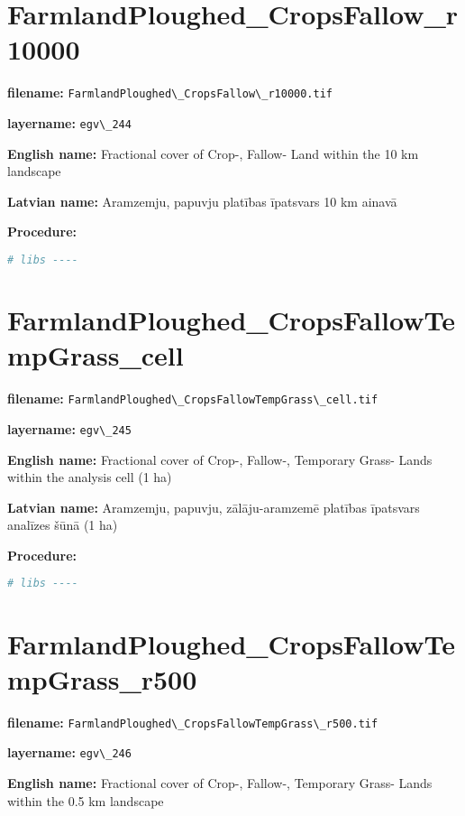 \documentclass[
]{book}
\newcommand{\passthrough}[1]{#1}
\begin{document}
\section{FarmlandPloughed\_CropsFallow\_r10000}\label{ch06.244}

\textbf{filename:} \passthrough{\lstinline!FarmlandPloughed\_CropsFallow\_r10000.tif!}

\textbf{layername:} \passthrough{\lstinline!egv\_244!}

\textbf{English name:} Fractional cover of Crop-, Fallow- Land within the 10 km landscape

\textbf{Latvian name:} Aramzemju, papuvju platības īpatsvars 10 km ainavā

\textbf{Procedure:}

\begin{lstlisting}[language=R]
# libs ----
\end{lstlisting}

\section{FarmlandPloughed\_CropsFallowTempGrass\_cell}\label{ch06.245}

\textbf{filename:} \passthrough{\lstinline!FarmlandPloughed\_CropsFallowTempGrass\_cell.tif!}

\textbf{layername:} \passthrough{\lstinline!egv\_245!}

\textbf{English name:} Fractional cover of Crop-, Fallow-, Temporary Grass- Lands within the analysis cell (1 ha)

\textbf{Latvian name:} Aramzemju, papuvju, zālāju-aramzemē platības īpatsvars analīzes šūnā (1 ha)

\textbf{Procedure:}

\begin{lstlisting}[language=R]
# libs ----
\end{lstlisting}

\section{FarmlandPloughed\_CropsFallowTempGrass\_r500}\label{ch06.246}

\textbf{filename:} \passthrough{\lstinline!FarmlandPloughed\_CropsFallowTempGrass\_r500.tif!}

\textbf{layername:} \passthrough{\lstinline!egv\_246!}

\textbf{English name:} Fractional cover of Crop-, Fallow-, Temporary Grass- Lands within the 0.5 km landscape
\end{document}
